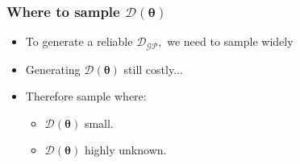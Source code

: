 \documentclass{beamer}
\begin{document}
\begin{frame}
    \frametitle{Where to sample $\mathcal{D}(\bm{\theta})$}
    \begin{itemize}
        \item To generate a reliable $\mathcal{D}_{\mathcal{GP}},$ we need to
              sample widely
        \item Generating $\mathcal{D}(\bm{\theta})$ still costly...
        \item Therefore sample where:
              \begin{itemize}
                  \item <2-> $\mathcal{D}(\bm{\theta})$ small.
                  \item <3-> $\mathcal{D}(\bm{\theta})$ highly unknown.
              \end{itemize}
    \end{itemize}
\end{frame}
\end{document}
